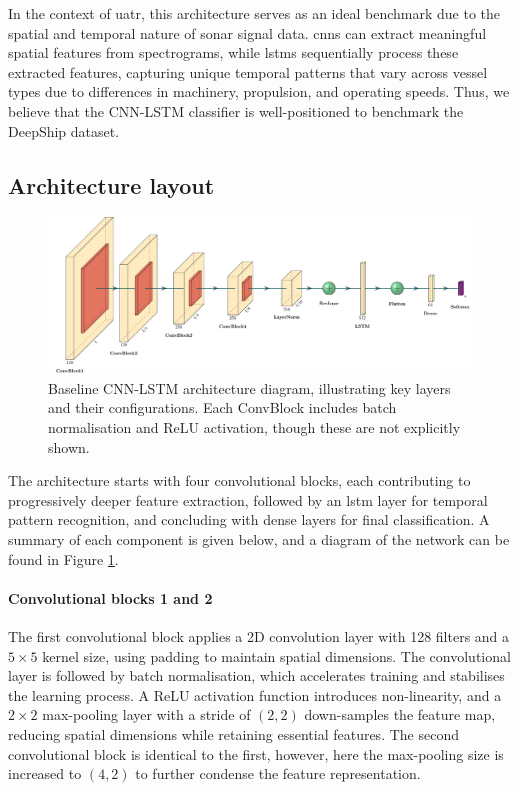 In the context of \acrshort{uatr}, this architecture serves as an ideal benchmark due to the spatial and temporal nature of sonar signal data. \acrshort{cnn}s can extract meaningful spatial features from spectrograms, while \acrshort{lstm}s sequentially process these extracted features, capturing unique temporal patterns that vary across vessel types due to differences in machinery, propulsion, and operating speeds. Thus, we believe that the CNN-LSTM classifier is well-positioned to benchmark the DeepShip dataset. 

\subsection{Architecture layout}

\begin{figure}
    \centering
    \includegraphics[width=\linewidth]{img/ch3/architecture_diagram.pdf}
    \caption{Baseline CNN-LSTM architecture diagram, illustrating key layers and their configurations. Each ConvBlock includes batch normalisation and ReLU activation, though these are not explicitly shown.}
    \label{fig:cnn-lstm-architecture}
\end{figure}

The architecture starts with four convolutional blocks, each contributing to progressively deeper feature extraction, followed by an \acrshort{lstm} layer for temporal pattern recognition, and concluding with dense layers for final classification. A summary of each component is given below, and a diagram of the network can be found in Figure \ref{fig:cnn-lstm-architecture}.

\paragraph{Convolutional blocks 1 and 2} The first convolutional block applies a 2D convolution layer with 128 filters and a $5\times5$ kernel size, using padding to maintain spatial dimensions. The convolutional layer is followed by batch normalisation, which accelerates training and stabilises the learning process. A ReLU activation function introduces non-linearity, and a $2\times2$ max-pooling layer with a stride of $(2,2)$ down-samples the feature map, reducing spatial dimensions while retaining essential features. The second convolutional block is identical to the first, however, here the max-pooling size is increased to $(4,2)$ to further condense the feature representation.

